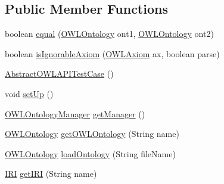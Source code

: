 \subsection*{Public Member Functions}
\begin{DoxyCompactItemize}
\item 
boolean \hyperlink{classorg_1_1semanticweb_1_1owlapi_1_1api_1_1test_1_1baseclasses_1_1_abstract_o_w_l_a_p_i_test_case_a28374f20ff0b0487f4a64d2a95325925}{equal} (\hyperlink{interfaceorg_1_1semanticweb_1_1owlapi_1_1model_1_1_o_w_l_ontology}{O\-W\-L\-Ontology} ont1, \hyperlink{interfaceorg_1_1semanticweb_1_1owlapi_1_1model_1_1_o_w_l_ontology}{O\-W\-L\-Ontology} ont2)
\item 
boolean \hyperlink{classorg_1_1semanticweb_1_1owlapi_1_1api_1_1test_1_1baseclasses_1_1_abstract_o_w_l_a_p_i_test_case_a4ada00f32f8be37d40b8bc397e282159}{is\-Ignorable\-Axiom} (\hyperlink{interfaceorg_1_1semanticweb_1_1owlapi_1_1model_1_1_o_w_l_axiom}{O\-W\-L\-Axiom} ax, boolean parse)
\item 
\hyperlink{classorg_1_1semanticweb_1_1owlapi_1_1api_1_1test_1_1baseclasses_1_1_abstract_o_w_l_a_p_i_test_case_a3aeab5cc6a787df47577b79793441656}{Abstract\-O\-W\-L\-A\-P\-I\-Test\-Case} ()
\item 
void \hyperlink{classorg_1_1semanticweb_1_1owlapi_1_1api_1_1test_1_1baseclasses_1_1_abstract_o_w_l_a_p_i_test_case_a4efe7f3a241e55b21d73016630daa199}{set\-Up} ()
\item 
\hyperlink{interfaceorg_1_1semanticweb_1_1owlapi_1_1model_1_1_o_w_l_ontology_manager}{O\-W\-L\-Ontology\-Manager} \hyperlink{classorg_1_1semanticweb_1_1owlapi_1_1api_1_1test_1_1baseclasses_1_1_abstract_o_w_l_a_p_i_test_case_a9a95e19ffbed7c9209c6e2e4c83e54ae}{get\-Manager} ()
\item 
\hyperlink{interfaceorg_1_1semanticweb_1_1owlapi_1_1model_1_1_o_w_l_ontology}{O\-W\-L\-Ontology} \hyperlink{classorg_1_1semanticweb_1_1owlapi_1_1api_1_1test_1_1baseclasses_1_1_abstract_o_w_l_a_p_i_test_case_a9838101b6587a127dbf8c83a6195321f}{get\-O\-W\-L\-Ontology} (String name)
\item 
\hyperlink{interfaceorg_1_1semanticweb_1_1owlapi_1_1model_1_1_o_w_l_ontology}{O\-W\-L\-Ontology} \hyperlink{classorg_1_1semanticweb_1_1owlapi_1_1api_1_1test_1_1baseclasses_1_1_abstract_o_w_l_a_p_i_test_case_ad95ff38c05ccb50a388681aeccf554b2}{load\-Ontology} (String file\-Name)
\item 
\hyperlink{classorg_1_1semanticweb_1_1owlapi_1_1model_1_1_i_r_i}{I\-R\-I} \hyperlink{classorg_1_1semanticweb_1_1owlapi_1_1api_1_1test_1_1baseclasses_1_1_abstract_o_w_l_a_p_i_test_case_a3818fe4d853ffea0f786d1115a1c5432}{get\-I\-R\-I} (String name)

\end{DoxyCompactItemize}

